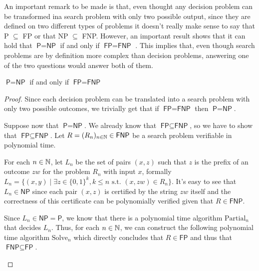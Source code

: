 An important remark to be made is that, even thought any decision problem can be transformed ina search problem with only two possible output, since they are defined on two different types of problems it doesn't really make sense to say that \textsf{P} $\subseteq$ \textsf{FP} or that \textsf{NP} $\subseteq$ \textsf{FNP}. However, an important result shows that it can hold that $\textsf{P} = \textsf{NP} $ if and only if $\textsf{FP} = \textsf{FNP}$ \cite{decision_vs_search, fp_vs_p}. This implies that, even though search problems are by definition more complex than decision problems, answering one of the two questions would answer both of them.

\begin{theorem}
    $\textsf{P} = \textsf{NP}$ if and only if $\textsf{FP} = \textsf{FNP}$
\end{theorem}

\begin{proof}
    Since each decision problem can be translated into a search problem with only two possible outcomes, we trivially get that if $\textsf{FP} = \textsf{FNP}$ then $\textsf{P} = \textsf{NP}$.
    
    Suppose now that $\textsf{P} = \textsf{NP}$. We already know that $\textsf{FP} \subseteq \textsf{FNP}$, so we have to show that $\textsf{FP} \subseteq \textsf{FNP}$. Let $R = (R_n)_{n \in \mathbb{N}} \in \textsf{FNP}$ be a search problem verifiable in polynomial time.
    
    For each $n \in \mathbb{N}$, let $L_n$ be the set of pairs $(x,z)$ such that $z$ is the prefix of an outcome $zw$ for the problem $R_n$ with input $x$, formally $L_n = \{(x,y) \mid \exists z \in \{0,1\}^{k}, k \leq n \text{ s.t. } (x,zw) \in R_n\}$. It's easy to see that $L_n \in \textsf{NP}$ since each pair $(x,z)$ is certified by the string $zw$ itself and the correctness of this certificate can be polynomially verified given that $R \in \textsf{FNP}$.
    
    Since $L_n \in \textsf{NP} = \textsf{P}$, we know that there is a polynomial time algorithm $\mathrm{Partial}_n$ that decides $L_n$. Thus, for each $n \in \mathbb{N}$, we can construct the following polynomial time algorithm $\mathrm{Solve}_n$ which directly concludes that $R \in \textsf{FP}$ and thus that $\textsf{FNP} \subseteq \textsf{FP}$.

    \begin{algorithmic}
                \Else
                \EndIf
            \EndWhile
        \EndFunction
    \end{algorithmic}
\end{proof}

